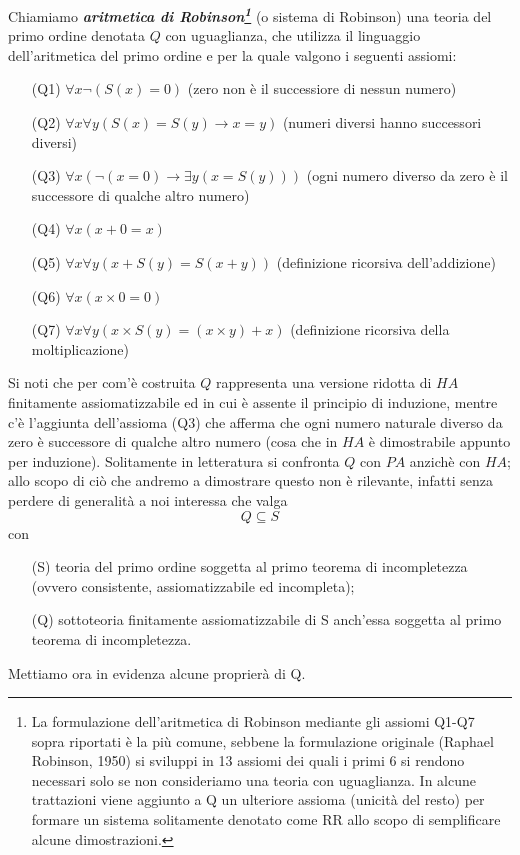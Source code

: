 \begin{defi}
Chiamiamo \textbf{\emph{aritmetica di Robinson\footnote{La formulazione dell'aritmetica di Robinson mediante 
gli assiomi Q1-Q7 sopra riportati è la più comune, 
sebbene la formulazione originale (Raphael Robinson, 1950) si sviluppi in 13 assiomi dei quali i primi 6
si rendono necessari solo se non consideriamo una teoria con uguaglianza. In alcune trattazioni 
viene aggiunto a Q un ulteriore assioma (unicità del resto) per formare un sistema solitamente denotato
come RR allo scopo di semplificare alcune dimostrazioni.}
}} (o sistema di Robinson) una teoria del primo ordine denotata $Q$ con uguaglianza,
che utilizza il linguaggio dell'aritmetica del primo ordine e per la quale valgono i seguenti assiomi:
\end{defi}
\begin{itemize}
 \item [(Q1)] $\forall x \neg (S(x)=0)$
 \newline (zero non è il successiore di nessun numero)
 \item [(Q2)] $\forall x \forall y (S(x)=S(y) \rightarrow x=y) $
 \newline (numeri diversi hanno successori diversi)
 \item [(Q3)] $\forall x ( \neg(x=0) \rightarrow \exists y(x=S(y))) $
 \newline (ogni numero diverso da zero è il successore di qualche altro numero)
 \item [(Q4)] $\forall x(x+0=x)$
 \item [(Q5)] $\forall x \forall y (x+S(y)=S(x+y))$
 \newline (definizione ricorsiva dell'addizione)
 \item [(Q6)] $\forall x(x\times0=0)$
 \item [(Q7)] $\forall x \forall y (x\times S(y)=(x \times y)+x)$
 \newline (definizione ricorsiva della moltiplicazione)
\end{itemize}

Si noti che per com'è costruita $Q$ rappresenta una versione ridotta di $HA$ finitamente assiomatizzabile
ed in cui è assente
 il principio di induzione, mentre c'è l'aggiunta dell'assioma (Q3) che afferma che ogni numero naturale diverso
 da zero è successore di qualche altro numero (cosa che in $HA$ è dimostrabile appunto per induzione).
Solitamente in letteratura si confronta $Q$ con $PA$ anzichè con $HA$; allo scopo di ciò che andremo a
dimostrare questo non è rilevante, infatti senza perdere di generalità a noi interessa che valga
$$ Q \subseteq S $$
con
\begin{itemize}
 \item [(S)] teoria del primo ordine soggetta al primo teorema di incompletezza (ovvero consistente,
assiomatizzabile ed incompleta);
 \item [(Q)] sottoteoria finitamente assiomatizzabile di S anch'essa soggetta al primo teorema di incompletezza.
\end{itemize}
Mettiamo ora in evidenza alcune proprierà di Q.

